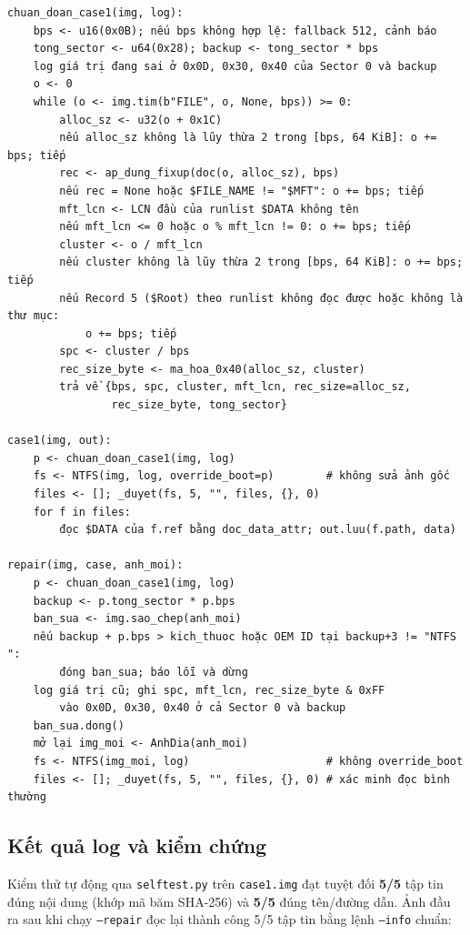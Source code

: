 \begin{verbatim}
chuan_doan_case1(img, log):
    bps <- u16(0x0B); nếu bps không hợp lệ: fallback 512, cảnh báo
    tong_sector <- u64(0x28); backup <- tong_sector * bps
    log giá trị đang sai ở 0x0D, 0x30, 0x40 của Sector 0 và backup
    o <- 0
    while (o <- img.tim(b"FILE", o, None, bps)) >= 0:
        alloc_sz <- u32(o + 0x1C)
        nếu alloc_sz không là lũy thừa 2 trong [bps, 64 KiB]: o += bps; tiếp
        rec <- ap_dung_fixup(doc(o, alloc_sz), bps)
        nếu rec = None hoặc $FILE_NAME != "$MFT": o += bps; tiếp
        mft_lcn <- LCN đầu của runlist $DATA không tên
        nếu mft_lcn <= 0 hoặc o % mft_lcn != 0: o += bps; tiếp
        cluster <- o / mft_lcn
        nếu cluster không là lũy thừa 2 trong [bps, 64 KiB]: o += bps; tiếp
        nếu Record 5 ($Root) theo runlist không đọc được hoặc không là thư mục:
            o += bps; tiếp
        spc <- cluster / bps
        rec_size_byte <- ma_hoa_0x40(alloc_sz, cluster)
        trả về {bps, spc, cluster, mft_lcn, rec_size=alloc_sz,
                rec_size_byte, tong_sector}

case1(img, out):
    p <- chuan_doan_case1(img, log)
    fs <- NTFS(img, log, override_boot=p)        # không sửa ảnh gốc
    files <- []; _duyet(fs, 5, "", files, {}, 0)
    for f in files:
        đọc $DATA của f.ref bằng doc_data_attr; out.luu(f.path, data)

repair(img, case, anh_moi):
    p <- chuan_doan_case1(img, log)
    backup <- p.tong_sector * p.bps
    ban_sua <- img.sao_chep(anh_moi)
    nếu backup + p.bps > kich_thuoc hoặc OEM ID tại backup+3 != "NTFS    ":
        đóng ban_sua; báo lỗi và dừng
    log giá trị cũ; ghi spc, mft_lcn, rec_size_byte & 0xFF
        vào 0x0D, 0x30, 0x40 ở cả Sector 0 và backup
    ban_sua.dong()
    mở lại img_moi <- AnhDia(anh_moi)
    fs <- NTFS(img_moi, log)                     # không override_boot
    files <- []; _duyet(fs, 5, "", files, {}, 0) # xác minh đọc bình thường
\end{verbatim}

\subsection{Kết quả log và kiểm chứng}

Kiểm thử tự động qua \texttt{selftest.py} trên \texttt{case1.img} đạt tuyệt đối \textbf{5/5} tập tin đúng nội dung (khớp mã băm SHA-256) và \textbf{5/5} đúng tên/đường dẫn. Ảnh đầu ra sau khi chạy \texttt{--repair} đọc lại thành công 5/5 tập tin bằng lệnh \texttt{--info} chuẩn:

